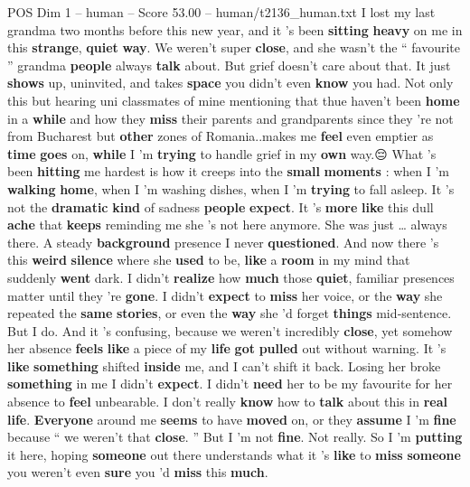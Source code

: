 \begin{textsample}{POS Dim 1 – human – Score 53.00 – human/t2136\_human.txt}  \label{ex:f1_pos_031}
I lost my last grandma two months before this new year, and it ’s been \textbf{sitting} \textbf{heavy} on me in this \textbf{strange}, \textbf{quiet} \textbf{way}.
We weren't super \textbf{close}, and she wasn't the “ favourite ” grandma \textbf{people} always \textbf{talk} about.
But grief doesn't care about that.
It just \textbf{shows} up, uninvited, and takes \textbf{space} you didn't even \textbf{know} you had.
Not only this but hearing uni classmates of mine mentioning that thue haven't been \textbf{home} in a \textbf{while} and how they \textbf{miss} their parents and grandparents since they 're not from Bucharest but \textbf{other} zones of Romania..makes me \textbf{feel} even emptier as \textbf{time} \textbf{goes} on, \textbf{while} I 'm \textbf{trying} to handle grief in my \textbf{own} way.{\EmojiFont 😔} What ’s been \textbf{hitting} me hardest is how it creeps into the \textbf{small} \textbf{moments} : when I ’m \textbf{walking} \textbf{home}, when I ’m washing dishes, when I ’m \textbf{trying} to fall asleep.
It ’s not the \textbf{dramatic} \textbf{kind} of sadness \textbf{people} \textbf{expect}.
It ’s \textbf{more} \textbf{like} this dull \textbf{ache} that \textbf{keeps} reminding me she ’s not here anymore.
She was just … always there.
A steady \textbf{background} presence I never \textbf{questioned}.
And now there ’s this \textbf{weird} \textbf{silence} where she \textbf{used} to be, \textbf{like} a \textbf{room} in my mind that suddenly \textbf{went} dark.
I didn't \textbf{realize} how \textbf{much} those \textbf{quiet}, familiar presences matter until they ’re \textbf{gone}.
I didn't \textbf{expect} to \textbf{miss} her voice, or the \textbf{way} she repeated the \textbf{same} \textbf{stories}, or even the \textbf{way} she ’d forget \textbf{things} mid‑sentence.
But I do.
And it ’s confusing, because we weren't incredibly \textbf{close}, yet somehow her absence \textbf{feels} \textbf{like} a piece of my \textbf{life} \textbf{got} \textbf{pulled} out without warning.
It ’s \textbf{like} \textbf{something} shifted \textbf{inside} me, and I can't shift it back.
Losing her broke \textbf{something} in me I didn't \textbf{expect}.
I didn't \textbf{need} her to be my favourite for her absence to \textbf{feel} unbearable.
I don't really \textbf{know} how to \textbf{talk} about this in \textbf{real} \textbf{life}. \textbf{Everyone} around me \textbf{seems} to have \textbf{moved} on, or they \textbf{assume} I ’m \textbf{fine} because “ we weren't that \textbf{close}. ” But I ’m not \textbf{fine}.
Not really.
So I ’m \textbf{putting} it here, hoping \textbf{someone} out there understands what it ’s \textbf{like} to \textbf{miss} \textbf{someone} you weren't even \textbf{sure} you ’d \textbf{miss} this \textbf{much}.


\end{textsample}
